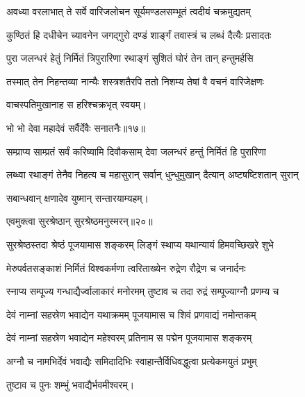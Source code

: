 \twolineshloka
{अवध्या वरलाभात् ते सर्वे वारिजलोचन}
{सूर्यमण्डलसम्भूतं त्वदीयं चक्रमुद्यतम्} %

\twolineshloka
{कुण्ठितं हि दधीचेन च्यावनेन जगद्गुरो}
{दण्डं शार्ङ्गं तवास्त्रं च लब्धं दैत्यैः प्रसादतः} %

\twolineshloka
{पुरा जलन्धरं हेतुं निर्मितं त्रिपुरारिणा}
{रथाङ्गं सुशितं घोरं तेन तान् हन्तुमर्हसि} %

\twolineshloka
{तस्मात् तेन निहन्तव्या नान्यैः शस्त्रशतैरपि}
{ततो निशम्य तेषां वै वचनं वारिजेक्षणः} %


{वाचस्पतिमुखानाह स हरिश्चक्रभृत् स्वयम्।}

{भो भो देवा महादेवं सर्वैर्देवैः सनातनैः॥१७॥} %
\addtocounter{shlokacount}{1}

\twolineshloka
{सम्प्राप्य साम्प्रतं सर्वं करिष्यामि दिवौकसाम्}
{देवा जलन्धरं हन्तुं निर्मितं हि पुरारिणा} %

\twolineshloka
{लब्ध्वा रथाङ्गं तेनैव निहत्य च महासुरान्}
{सर्वान् धुन्धुमुखान् दैत्यान् अष्टषष्टिशतान् सुरान्} %

{सबान्धवान् क्षणादेव युष्मान् सन्तारयाम्यहम्।}


{एवमुक्त्वा सुरश्रेष्ठान् सुरश्रेष्ठमनुस्मरन्॥२०॥} %

\addtocounter{shlokacount}{1}

\twolineshloka
{सुरश्रेष्ठस्तदा श्रेष्ठं पूजयामास शङ्करम्}
{लिङ्गं स्थाप्य यथान्यायं हिमवच्छिखरे शुभे} %

\twolineshloka
{मेरुपर्वतसङ्काशं निर्मितं विश्वकर्मणा}
{त्वरिताख्येन रुद्रेण रौद्रेण च जनार्दनः} %

\twolineshloka
{स्नाप्य सम्पूज्य गन्धाद्यैर्ज्वालाकारं मनोरमम्}
{तुष्टाव च तदा रुद्रं सम्पूज्याग्नौ प्रणम्य च} %

\twolineshloka
{देवं नाम्नां सहस्रेण भवाद्येन यथाक्रमम्}
{पूजयामास च शिवं प्रणवाद्यं नमोन्तकम्} %

\twolineshloka
{देवं नाम्नां सहस्रेण भवाद्येन महेश्वरम्}
{प्रतिनाम स पद्मेन पूजयामास शङ्करम्} %

\twolineshloka
{अग्नौ च नामभिर्देवं भवाद्यैः समिदादिभिः}
{स्वाहान्तैर्विधिवद्धुत्वा प्रत्येकमयुतं प्रभुम्} %

तुष्टाव च पुनः शम्भुं भवाद्यैर्भवमीश्वरम्।




\resetShloka

